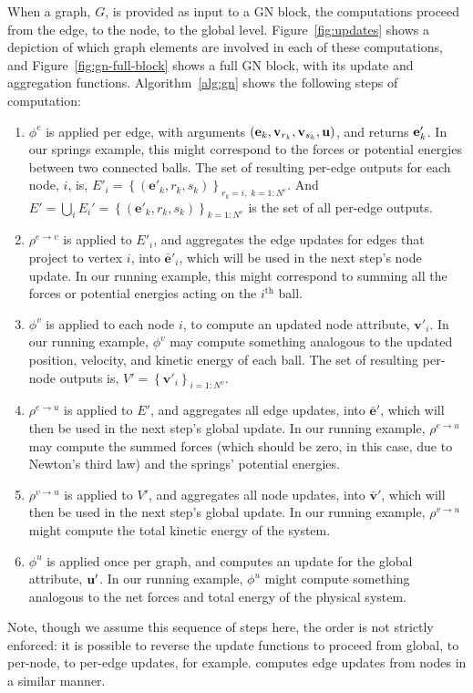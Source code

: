 When a graph, $G$, is provided as input to a GN block, the computations proceed from the edge, to the node, to the global level. Figure~\ref{fig:updates} shows a depiction of which graph elements are involved in each of these computations, and Figure~\ref{fig:gn-full-block} shows a full GN block, with its update and aggregation functions.
Algorithm~\ref{alg:gn} shows the following steps of computation:
\begin{enumerate}[noitemsep]
\item $\phi^e$ is applied per edge, with arguments $(\mathbf{e}_k, \mathbf{v}_{r_k}, \mathbf{v}_{s_k}, \mathbf{u})$, and returns $\mathbf{e}'_k$. In our springs example, this might correspond to the forces or potential energies between two connected balls. The set of resulting per-edge outputs for each node, $i$, is,
$E'_i = \left\{\left(\mathbf{e}'_k, r_k, s_k \right)\right\}_{r_k=i,\; k=1:N^e}$. And $E' = \bigcup_i E_i' = \left\{\left(\mathbf{e}'_k, r_k, s_k \right)\right\}_{k=1:N^e}$ is the set of all per-edge outputs.
%
\item $\rho^{e\rightarrow v}$ is applied to $E'_i$, and aggregates the edge updates for edges that project to vertex $i$, into $\mathbf{\bar{e}}'_i$, which will be used in the next step's node update. In our running example, this might correspond to summing all the forces or potential energies acting on the $i^\mathrm{th}$ ball.
%
\item $\phi^v$ is applied to each node $i$,
to compute an updated node attribute, $\mathbf{v}'_i$. 
In our running example, $\phi^v$ may compute something analogous to the updated position, velocity, and kinetic energy of each ball.
The set of resulting per-node outputs is, $V'=\left\{\mathbf{v}'_i\right\}_{i=1:N^v}$.
%
\item $\rho^{e\rightarrow u}$ is applied to $E'$, and aggregates all edge updates, into $\mathbf{\bar{e}}'$, which will then be used in the next step's global update. In our running example, $\rho^{e\rightarrow u}$ may compute the summed forces (which should be zero, in this case, due to Newton's third law) and the springs' potential energies.
%
\item $\rho^{v \rightarrow u}$ is applied to $V'$, and aggregates all node updates, into $\mathbf{\bar{v}}'$, which will then be used in the next step's global update. In our running example, $\rho^{v\rightarrow u}$ might compute the total kinetic energy of the system.
%
\item $\phi^u$ is applied once per graph, 
and computes an update for the global attribute, $\mathbf{u}'$. 
In our running example, $\phi^u$ might compute something analogous to the net forces and total energy of the physical system.
\end{enumerate}
Note, though we assume this sequence of steps here, the order is not strictly enforced: it is possible to reverse the update functions to proceed from global, to per-node, to per-edge updates, for example. \cite{kearnes2016molecular} computes edge updates from nodes in a similar manner.


